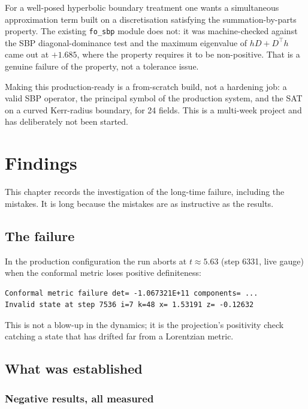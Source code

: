 \label{sec:sbp}

For a well-posed hyperbolic boundary treatment one wants a simultaneous
approximation term built on a discretisation satisfying the summation-by-parts
property. The existing \texttt{fo\_sbp} module does not: it was machine-checked
against the SBP diagonal-dominance test and the maximum eigenvalue of
$hD + D^\top h$ came out at $+1.685$, where the property requires it to be
non-positive. That is a genuine failure of the property, not a tolerance
issue.

Making this production-ready is a from-scratch build, not a hardening job: a
valid SBP operator, the principal symbol of the production system, and the
SAT on a curved Kerr-radius boundary, for 24 fields. This is a multi-week
project and has deliberately not been started.

\section{Findings}
\label{ch:findings}

This chapter records the investigation of the long-time failure, including the
mistakes. It is long because the mistakes are as instructive as the results.

\subsection{The failure}

In the production configuration the run aborts at $t \approx 5.63$
(step 6331, live gauge) when the conformal metric loses positive definiteness:
\begin{lstlisting}
Conformal metric failure det= -1.067321E+11 components= ...
Invalid state at step 7536 i=7 k=48 x= 1.53191 z= -0.12632
\end{lstlisting}
This is not a blow-up in the dynamics; it is the projection's positivity check
catching a state that has drifted far from a Lorentzian metric.

\subsection{What was established}

\subsubsection{Negative results, all measured}

